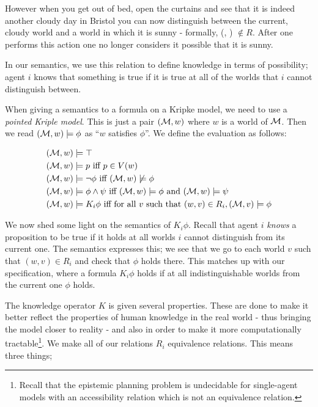 \documentclass[10pt, a4paper]{report}
\begin{document}
However when you get out of bed, open the curtains and see that it is indeed
another cloudy day in Bristol you can now distinguish between the current,
cloudy world and a world in which it is sunny - formally, (\Sun, \Cloud) $\not
\in R$. After one performs this action one no longer considers it possible that
it is sunny.

In our semantics, we use this relation to define knowledge in terms of
possibility; agent $i$ knows that something is true if it is true at all of the
worlds that $i$ cannot distinguish between.

\bigskip

When giving a semantics to a formula on a Kripke model, we need to use a
\emph{pointed Kriple model}. This is just a pair $(\mathcal{M}, w)$ where $w$ is a
world of $\mathcal{M}$. Then we read $(\mathcal{M}, w) \models \phi$ as ``$w$ satisfies
$\phi$''. We define the evaluation as follows:

\begin{align*}
  (\mathcal{M}, w) & \models \top \\
  (\mathcal{M}, w) & \models p \text{ iff } p \in V(w) \\
  (\mathcal{M}, w) & \models \neg \phi \text{ iff } (\mathcal{M}, w) \not \models \phi \\
  (\mathcal{M}, w) & \models \phi \land \psi \text{ iff } (\mathcal{M}, w) \models \phi \text{ and } (\mathcal{M}, w) \models \psi \\
  (\mathcal{M}, w) & \models K_i \phi \text{ iff for all $v$ such that } (w, v) \in R_i, (\mathcal{M}, v) \models \phi 
\end{align*}

We now shed some light on the semantics of $K_i \phi$. Recall that agent $i$
\emph{knows} a proposition to be true if it holds at all worlds $i$ cannot
distinguish from its current one. The semantics expresses this; we see that we
go to each world $v$ such that $(w, v) \in R_i$ and check that $\phi$ holds
there. This matches up with our specification, where a formula $K_i \phi$ holds
if at all indistinguishable worlds from the current one $\phi$ holds.

\bigskip 

The knowledge operator $K$ is given several properties. These are done to make
it better reflect the properties of human knowledge in the real world - thus
bringing the model closer to reality - and also in order to make it more
computationally tractable\footnote{Recall that the epistemic planning problem is
  undecidable for single-agent models with an accessibility relation which is
  not an equivalence relation.}. We make all of our relations $R_i$ equivalence
relations. This means three things;
\end{document}
